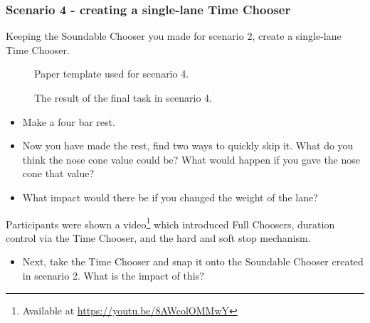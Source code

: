 \documentclass{ppig}
\begin{document}
\hypertarget{scenario-4---creating-a-single-lane-time-chooser}{%
\subsubsection{Scenario 4 - creating a single-lane Time
Chooser}\label{scenario-4---creating-a-single-lane-time-chooser}}

Keeping the Soundable Chooser you made for scenario 2, create a
single-lane Time Chooser.

\begin{figure}[!h]
	\begin{floatrow}
			{\caption{Paper template used for scenario 4.}\label{fig:scenario4}}
			{\caption{The result of the final task in scenario 4.}\label{fig:scenario4end}}
	\end{floatrow}
\end{figure}


\begin{itemize}
\item
  Make a four bar rest.
\item
  Now you have made the rest, find two ways to quickly skip it. What do
  you think the nose cone value could be? What would happen if you gave
  the nose cone that value?
\item
  What impact would there be if you changed the weight of the lane?
\end{itemize}

Participants were shown a video\footnote{Available at
  \url{https://youtu.be/8AWcolOMMwY}} which introduced Full Choosers,
duration control via the Time Chooser, and the hard and soft stop
mechanism.

\begin{itemize}
\item
  Next, take the Time Chooser and snap it onto the Soundable Chooser
  created in scenario 2. What is the impact of this?
\end{itemize}
\end{document}
